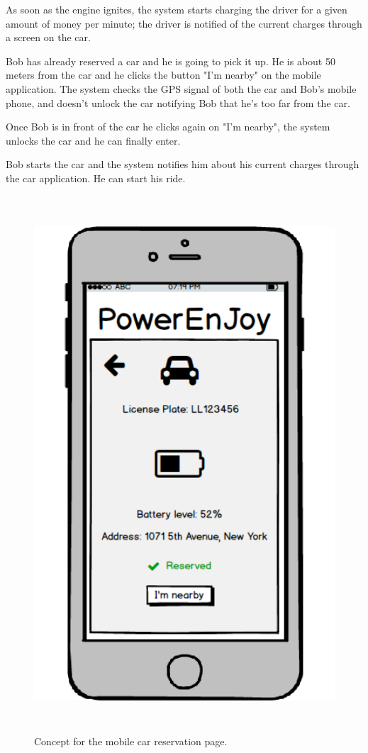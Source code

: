 As soon as the engine ignites, the system starts charging the driver for a given amount of money per minute; the driver is notified of the current charges through a screen on the car.

Bob has already reserved a car and he is going to pick it up. He is about 50 meters from the car and he clicks the button "I'm nearby" on the mobile application. The system checks the GPS signal of both the car and Bob's mobile phone, and doesn't unlock the car notifying Bob that he's too far from the car.

Once Bob is in front of the car he clicks again on "I'm nearby", the system unlocks the car and he can finally enter.

Bob starts the car and the system notifies him about his current charges through the car application. He can start his ride.

\begin{figure}[H]
	\centering
	\includegraphics[height=20cm]{mockup/MobileUnlock.png}
	\caption{Concept for the mobile car reservation page.}
\end{figure}


